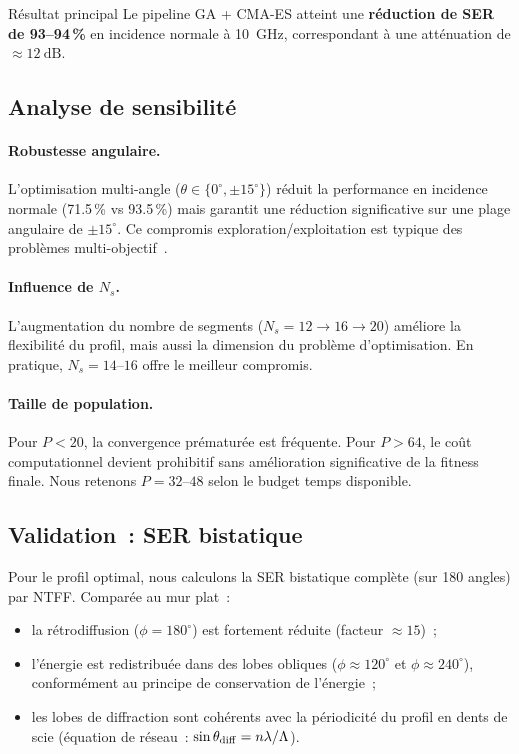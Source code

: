 \documentclass[12pt,a4paper]{article}
\begin{document}
\begin{resultbox}{Résultat principal}
Le pipeline GA + CMA-ES atteint une \textbf{réduction de SER de 93--94\,\%}
en incidence normale à \SI{10}{\giga\hertz}, correspondant à une atténuation
de $\approx \SI{12}{\dB}$.
\end{resultbox}

\subsection{Analyse de sensibilité}
\label{ssec:sensitivity}

\paragraph{Robustesse angulaire.}
L'optimisation multi-angle ($\theta \in \{0^\circ, \pm15^\circ\}$) réduit la
performance en incidence normale (71.5\,\% vs 93.5\,\%) mais garantit une réduction
significative sur une plage angulaire de $\pm 15^\circ$. Ce compromis
exploration/exploitation est typique des problèmes multi-objectif~\cite{Deb2002}.

\paragraph{Influence de $N_s$.}
L'augmentation du nombre de segments ($N_s = 12 \to 16 \to 20$) améliore la
flexibilité du profil, mais aussi la dimension du problème d'optimisation.
En pratique, $N_s = 14$--$16$ offre le meilleur compromis.

\paragraph{Taille de population.}
Pour $P < 20$, la convergence prématurée est fréquente. Pour $P > 64$, le coût
computationnel devient prohibitif sans amélioration significative de la fitness finale.
Nous retenons $P = 32$--$48$ selon le budget temps disponible.

\subsection{Validation~: SER bistatique}
\label{ssec:bistatic}

Pour le profil optimal, nous calculons la SER bistatique complète (sur 180 angles)
par NTFF. Comparée au mur plat~:
\begin{itemize}
    \item la rétrodiffusion ($\phi = 180^\circ$) est fortement réduite (facteur
          $\approx 15$)~;
    \item l'énergie est redistribuée dans des lobes obliques ($\phi \approx 120^\circ$
          et $\phi \approx 240^\circ$), conformément au principe de conservation de
          l'énergie~;
    \item les lobes de diffraction sont cohérents avec la périodicité du profil en
          dents de scie (équation de réseau~: $\sin\theta_{\rm diff} = n\lambda / \Lambda$).
\end{itemize}
\end{document}
